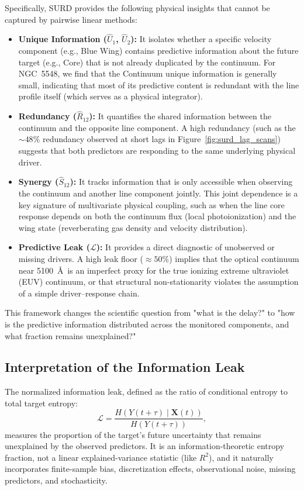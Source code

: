 \documentclass[fleqn,usenatbib]{mnras}
\begin{document}
Specifically, SURD provides the following physical insights that cannot be captured by pairwise linear methods:
\begin{itemize}
    \item \textbf{Unique Information ($\widehat{U}_1$, $\widehat{U}_2$):} It isolates whether a specific velocity component (e.g., Blue Wing) contains predictive information about the future target (e.g., Core) that is not already duplicated by the continuum. For NGC~5548, we find that the Continuum unique information is generally small, indicating that most of its predictive content is redundant with the line profile itself (which serves as a physical integrator).
    \item \textbf{Redundancy ($\widehat{R}_{12}$):} It quantifies the shared information between the continuum and the opposite line component. A high redundancy (such as the $\sim 48\%$ redundancy observed at short lags in Figure~\ref{fig:surd_lag_scans}) suggests that both predictors are responding to the same underlying physical driver.
    \item \textbf{Synergy ($\widehat{S}_{12}$):} It tracks information that is only accessible when observing the continuum and another line component jointly. This joint dependence is a key signature of multivariate physical coupling, such as when the line core response depends on both the continuum flux (local photoionization) and the wing state (reverberating gas density and velocity distribution).
    \item \textbf{Predictive Leak ($\mathcal{L}$):} It provides a direct diagnostic of unobserved or missing drivers. A high leak floor ($\approx 50\%$) implies that the optical continuum near 5100~\AA\ is an imperfect proxy for the true ionizing extreme ultraviolet (EUV) continuum, or that structural non-stationarity violates the assumption of a simple driver--response chain.
\end{itemize}
This framework changes the scientific question from "what is the delay?" to "how is the predictive information distributed across the monitored components, and what fraction remains unexplained?"

\subsection{Interpretation of the Information Leak}

The normalized information leak, defined as the ratio of conditional entropy to total target entropy:
\begin{equation}
\mathcal{L} = \frac{H(Y(t+\tau) \mid \mathbf{X}(t))}{H(Y(t+\tau))},
\end{equation}
measures the proportion of the target's future uncertainty that remains unexplained by the observed predictors. It is an information-theoretic entropy fraction, not a linear explained-variance statistic (like $R^2$), and it naturally incorporates finite-sample bias, discretization effects, observational noise, missing predictors, and stochasticity.
\end{document}
